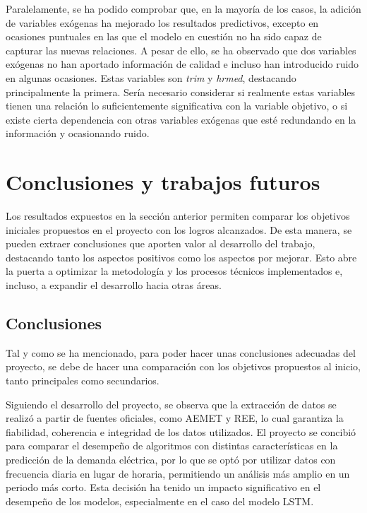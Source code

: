 \documentclass[12pt,a4paper]{report}
\begin{document}
Paralelamente, se ha podido comprobar que, en la mayoría de los casos, la adición de variables exógenas ha mejorado los resultados predictivos, excepto en ocasiones puntuales en las que el modelo en cuestión no ha sido capaz de capturar las nuevas relaciones. A pesar de ello, se ha observado que dos variables exógenas no han aportado información de calidad e incluso han introducido ruido en algunas ocasiones. Estas variables son \textit{trim} y \textit{hrmed}, destacando principalmente la primera. Sería necesario considerar si realmente estas variables tienen una relación lo suficientemente significativa con la variable objetivo, o si existe cierta dependencia con otras variables exógenas que esté redundando en la información y ocasionando ruido.

\chapter{Conclusiones y trabajos futuros}\label{cap:cap4}

Los resultados expuestos en la sección anterior permiten comparar los objetivos iniciales propuestos en el proyecto con los logros alcanzados. De esta manera, se pueden extraer conclusiones que aporten valor al desarrollo del trabajo, destacando tanto los aspectos positivos como los aspectos por mejorar. Esto abre la puerta a optimizar la metodología y los procesos técnicos implementados e, incluso, a expandir el desarrollo hacia otras áreas.

\section{Conclusiones}

Tal y como se ha mencionado, para poder hacer unas conclusiones adecuadas del proyecto, se debe de hacer una comparación con los objetivos propuestos al inicio, tanto principales como secundarios. 

Siguiendo el desarrollo del proyecto, se observa que la extracción de datos se realizó a partir de fuentes oficiales, como AEMET y REE, lo cual garantiza la fiabilidad, coherencia e integridad de los datos utilizados. El proyecto se concibió para comparar el desempeño de algoritmos con distintas características en la predicción de la demanda eléctrica, por lo que se optó por utilizar datos con frecuencia diaria en lugar de horaria, permitiendo un análisis más amplio en un periodo más corto. Esta decisión ha tenido un impacto significativo en el desempeño de los modelos, especialmente en el caso del modelo LSTM.
\end{document}
